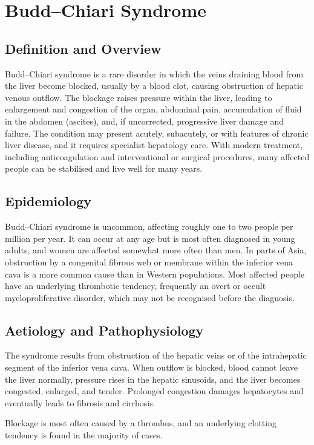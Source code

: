 \chapter{Budd--Chiari Syndrome}

\section*{Definition and Overview}
Budd--Chiari syndrome is a rare disorder in which the veins draining blood from the liver become blocked, usually by a blood clot, causing obstruction of hepatic venous outflow. The blockage raises pressure within the liver, leading to enlargement and congestion of the organ, abdominal pain, accumulation of fluid in the abdomen (ascites), and, if uncorrected, progressive liver damage and failure. The condition may present acutely, subacutely, or with features of chronic liver disease, and it requires specialist hepatology care. With modern treatment, including anticoagulation and interventional or surgical procedures, many affected people can be stabilised and live well for many years.

\section*{Epidemiology}
Budd--Chiari syndrome is uncommon, affecting roughly one to two people per million per year. It can occur at any age but is most often diagnosed in young adults, and women are affected somewhat more often than men. In parts of Asia, obstruction by a congenital fibrous web or membrane within the inferior vena cava is a more common cause than in Western populations. Most affected people have an underlying thrombotic tendency, frequently an overt or occult myeloproliferative disorder, which may not be recognised before the diagnosis.

\section*{Aetiology and Pathophysiology}
The syndrome results from obstruction of the hepatic veins or of the intrahepatic segment of the inferior vena cava. When outflow is blocked, blood cannot leave the liver normally, pressure rises in the hepatic sinusoids, and the liver becomes congested, enlarged, and tender. Prolonged congestion damages hepatocytes and eventually leads to fibrosis and cirrhosis.

Blockage is most often caused by a thrombus, and an underlying clotting tendency is found in the majority of cases.

